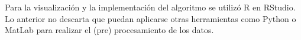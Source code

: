\documentclass[../Main.tex]{subfiles}
\begin{document}
\newline \par
Para la visualización y la implementación del algoritmo se utilizó R en RStudio. Lo anterior no descarta que puedan aplicarse otras herramientas como Python o MatLab para realizar el (pre) procesamiento de los datos.
\end{document}
